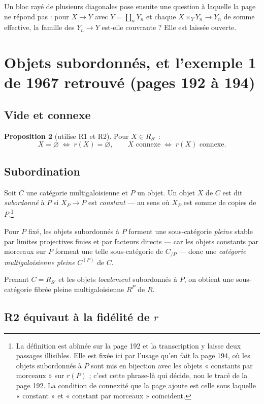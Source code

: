 \documentclass[11pt,a4paper]{article}
\begin{document}
Un bloc rayé de plusieurs diagonales pose ensuite une question à laquelle la
page ne répond pas : pour $X \to Y$ avec $Y = \coprod_{n} Y_{n}$ et chaque
$X \times_{Y} Y_{n} \to Y_{n}$ de somme effective, la famille des
$Y_{n} \to Y$ est-elle couvrante ? Elle est laissée ouverte.

\section*{Objets subordonnés, et l'exemple 1 de 1967 retrouvé (pages 192 à 194)}

\subsection*{Vide et connexe}

\textbf{Proposition 2} (utilise R1 et R2). Pour $X \in R_{S'}$ :
\[
  X = \varnothing \;\Longleftrightarrow\; r(X) = \varnothing ,
  \qquad
  X \text{ connexe} \;\Longleftrightarrow\; r(X) \text{ connexe} .
\]

\subsection*{Subordination}

Soit $C$ une catégorie multigaloisienne et $P$ un objet. Un objet $X$ de $C$
est dit \emph{subordonné} à $P$ si $X_{P} \to P$ est \emph{constant} --- au
sens où $X_{P}$ est somme de copies de $P$.\footnote{La définition est abîmée
sur la page 192 et la transcription y laisse deux passages illisibles. Elle est
fixée ici par l'usage qu'en fait la page 194, où les objets subordonnés à $P$
sont mis en bijection avec les objets « constants par morceaux » sur $r(P)$ ;
c'est cette phrase-là qui décide, non le tracé de la page 192. La condition de
connexité que la page ajoute est celle sous laquelle « constant » et
« constant par morceaux » coïncident.}

Pour $P$ fixé, les objets subordonnés à $P$ forment une sous-catégorie
\emph{pleine} stable par limites projectives finies et par facteurs directs ---
car les objets constants par morceaux sur $P$ forment une telle sous-catégorie
de $C_{/P}$ --- donc une \emph{catégorie multigaloisienne pleine} $C^{(P)}$
de $C$.

Prenant $C = R_{S'}$ et les objets \emph{localement} subordonnés à $P$, on
obtient une sous-catégorie fibrée pleine multigaloisienne $R^{P}$ de $R$.

\subsection*{R2 équivaut à la fidélité de $r$}
\end{document}
